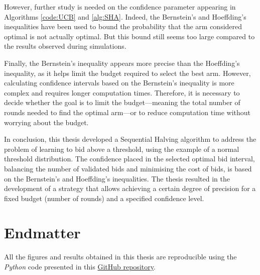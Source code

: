 \documentclass{statsmsc}
\begin{document}
However, further study is needed on the confidence parameter appearing in Algorithms \ref{code:UCB} and \ref{alg:SHA}. Indeed, the Bernstein's and Hoeffding's inequalities have been used to bound the probability that the arm considered optimal is not actually optimal. But this bound still seems too large compared to the results observed during simulations. 

Finally, the Bernstein's inequality appears more precise than the Hoeffding's inequality, as it helps limit the budget required to select the best arm. However, calculating confidence intervals based on the Bernstein's inequality is more complex and requires longer computation times. Therefore, it is necessary to decide whether the goal is to limit the budget—meaning the total number of rounds needed to find the optimal arm—or to reduce computation time without worrying about the budget.

In conclusion, this thesis developed a Sequential Halving algorithm to address the problem of learning to bid above a threshold, using the example of a normal threshold distribution. The confidence placed in the selected optimal bid interval, balancing the number of validated bids and minimising the cost of bids, is based on the Bernstein's and Hoeffding's inequalities. The thesis resulted in the development of a strategy that allows achieving a certain degree of precision for a fixed budget (number of rounds) and a specified confidence level.

\section{Endmatter} \label{sec:endmatter}

All the figures and results obtained in this thesis are reproducible using the \textit{Python} code presented in this \href{https://github.com/ICStudent02344391/learning-to-bid-above-a-threshold}{GitHub repository}.

%
%
%
%
%
%

%

\clearpage



\end{document}
